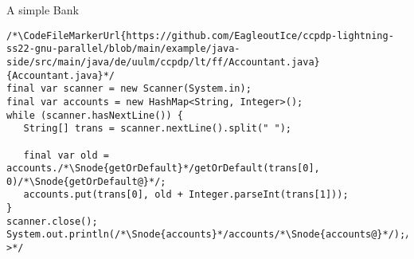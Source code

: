 \begin{frame}[fragile]{A simple Bank}
\begin{onlyenv}
\begin{layout-imageonly}
\begin{onlyenv}
\begin{verbatim}
/*\CodeFileMarkerUrl{https://github.com/EagleoutIce/ccpdp-lightning-ss22-gnu-parallel/blob/main/example/java-side/src/main/java/de/uulm/ccpdp/lt/ff/Accountant.java}{Accountant.java}*/
final var scanner = new Scanner(System.in);
final var accounts = new HashMap<String, Integer>();
while (scanner.hasNextLine()) {
   String[] trans = scanner.nextLine().split(" ");

   final var old = accounts./*\Snode{getOrDefault}*/getOrDefault(trans[0], 0)/*\Snode{getOrDefault@}*/;
   accounts.put(trans[0], old + Integer.parseInt(trans[1]));
}
scanner.close();
System.out.println(/*\Snode{accounts}*/accounts/*\Snode{accounts@}*/);/*\onslide<1->*/
\end{verbatim}
\end{onlyenv}
\end{layout-imageonly}
\end{onlyenv}
\end{frame}

